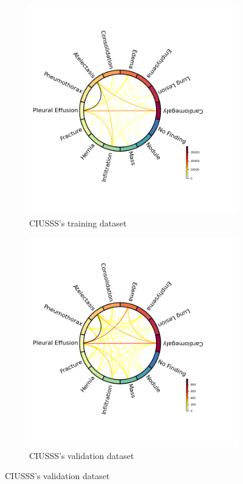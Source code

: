 \documentclass[11pt]{article}
\begin{document}
\newpage
\begin{figure}[h!]
     \centering
     \begin{subfigure}[b]{0.45\linewidth}
         \centering
         \includegraphics[width=\linewidth]{plots/chords_ciusss_train}
         \caption{CIUSSS's training dataset}
         \vspace{4ex}
         \label{fig:chords_ciusss_train}
     \end{subfigure}
     \hfill
     \begin{subfigure}[b]{0.45\linewidth}
         \centering
         \includegraphics[width=\linewidth]{plots/chords_ciusss_valid}
         \caption{CIUSSS's validation dataset}
         \vspace{4ex}
         \label{fig:chords_ciusss_valid}
     \end{subfigure}



\end{figure}
\end{document}
